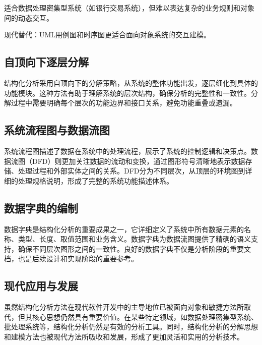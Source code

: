 适合数据处理密集型系统（如银行交易系统），但难以表达复杂的业务规则和对象间的动态交互。

现代替代：UML用例图和时序图更适合面向对象系统的交互建模。

\subsection{自顶向下逐层分解}

结构化分析采用自顶向下的分解策略，从系统的整体功能出发，逐层细化到具体的功能模块。这种方法有助于理解系统的层次结构，确保分析的完整性和一致性。分解过程中需要明确每个层次的功能边界和接口关系，避免功能重叠或遗漏。

\subsection{系统流程图与数据流图}

系统流程图描述了数据在系统中的处理流程，展示了系统的控制逻辑和决策点。数据流图（DFD）则更加关注数据的流动和变换，通过图形符号清晰地表示数据存储、处理过程和外部实体之间的关系。DFD分为不同层次，从顶层的环境图到详细的处理规格说明，形成了完整的系统功能描述体系。

\subsection{数据字典的编制}

数据字典是结构化分析的重要成果之一，它详细定义了系统中所有数据元素的名称、类型、长度、取值范围和业务含义。数据字典为数据流图提供了精确的语义支持，确保不同层次图形之间的一致性。良好的数据字典不仅是分析阶段的重要文档，也是后续设计和实现阶段的重要参考。

\subsection{现代应用与发展}

虽然结构化分析方法在现代软件开发中的主导地位已被面向对象和敏捷方法所取代，但其核心思想仍然具有重要价值。在某些特定领域，如数据处理密集型系统、批处理系统等，结构化分析仍然是有效的分析工具。同时，结构化分析的分解思想和建模方法也被现代方法所吸收和发展，形成了更加灵活和实用的分析技术。
